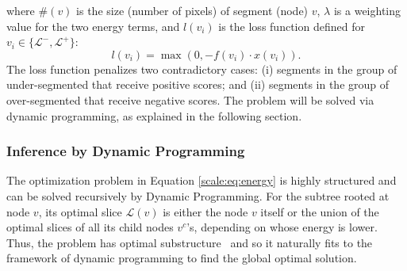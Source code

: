 where $\#(v)$ is the size (number of pixels) of segment (node) $v$, $\lambda$ is a
weighting value for the two energy terms, and $l(v_i)$ is the loss
function defined for $v_i \in \{ \mathcal{L}^-, \mathcal{L}^+ \}$:
\begin{equation}
  \label{scale:eq:loss:fun}
  l(v_i) = \max(0, -f(v_i)\cdot x(v_i)).
\end{equation}
The loss function penalizes two contradictory cases:
(i) segments in the group of under-segmented that receive positive scores; and
(ii) segments in the group of over-segmented that receive negative scores.
The problem will be solved via dynamic programming, as explained in the following section.



\subsubsection{Inference by Dynamic Programming}
\label{scale:sec:dp}
The optimization problem in Equation \ref{scale:eq:energy} is highly structured
and can be solved recursively by Dynamic Programming.
For the subtree rooted at node $v$, its optimal slice $\mathcal{L}(v)$ is either the
node $v$ itself or the union of the optimal slices of all its child
nodes $v^c$'s, depending on whose energy is lower.
Thus, the problem has optimal substructure~\citep{cormen2009introduction}
and so it naturally fits to the framework of dynamic programming to find the global optimal solution. 

